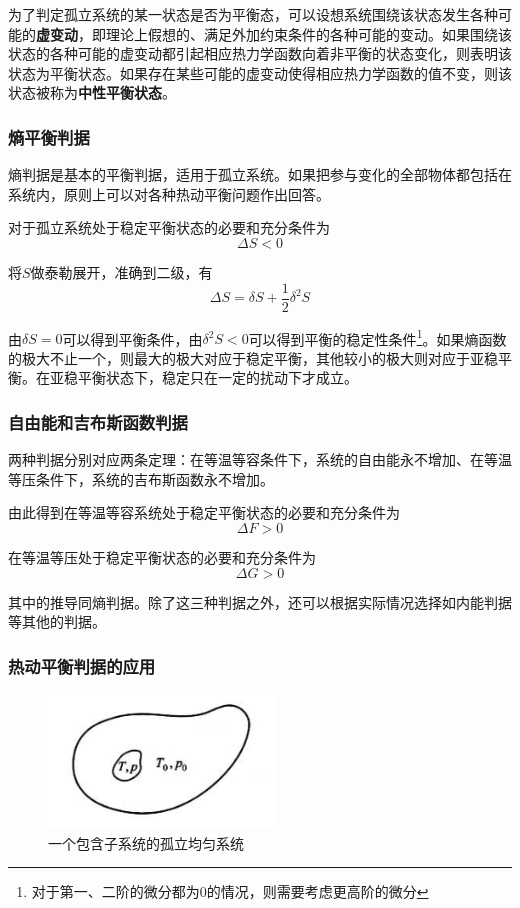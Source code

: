 \documentclass[UTF8]{ctexart}
\begin{document}
	为了判定孤立系统的某一状态是否为平衡态，可以设想系统围绕该状态发生各种可能的\textbf{虚变动}，即理论上假想的、满足外加约束条件的各种可能的变动。如果围绕该状态的各种可能的虚变动都引起相应热力学函数向着非平衡的状态变化，则表明该状态为平衡状态。如果存在某些可能的虚变动使得相应热力学函数的值不变，则该状态被称为\textbf{中性平衡状态}。
	
	\subsubsection{熵平衡判据}
	熵判据是基本的平衡判据，适用于孤立系统。如果把参与变化的全部物体都包括在系统内，原则上可以对各种热动平衡问题作出回答。
	
	对于孤立系统处于稳定平衡状态的必要和充分条件为
	\begin{equation}
		\Delta S < 0
	\end{equation}
	
\noindent 将$ S $做泰勒展开，准确到二级，有
\begin{equation}
\Delta S=\delta S+\frac{1}{2} \delta^{2} S
\end{equation}

\noindent 由$ \delta S = 0 $可以得到平衡条件，由$ \delta^{2} S < 0 $可以得到平衡的稳定性条件\footnote{对于第一、二阶的微分都为0的情况，则需要考虑更高阶的微分}。如果熵函数的极大不止一个，则最大的极大对应于稳定平衡，其他较小的极大则对应于亚稳平衡。在亚稳平衡状态下，稳定只在一定的扰动下才成立。

	\subsubsection{自由能和吉布斯函数判据}
	两种判据分别对应两条定理：在等温等容条件下，系统的自由能永不增加、在等温等压条件下，系统的吉布斯函数永不增加。
	
	由此得到在等温等容系统处于稳定平衡状态的必要和充分条件为
	\begin{equation}
	\Delta F>0
	\end{equation}
	
	在等温等压处于稳定平衡状态的必要和充分条件为
	\begin{equation}
	\Delta G>0
	\end{equation}
	
	其中的推导同熵判据。除了这三种判据之外，还可以根据实际情况选择如内能判据等其他的判据。
	
	\newpage
	\subsubsection{热动平衡判据的应用}
	\begin{figure}
		\includegraphics[width=6cm]{Ther_smallsystem.png}
		\caption{一个包含子系统的孤立均匀系统}
		\label{figure_1}
	\end{figure}
\end{document}
